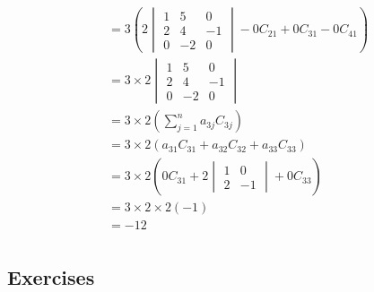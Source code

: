 \documentclass[12pt letter]{report}
\begin{document}
{{\begin{align*}
             & = 3 \left( 2 \begin{vmatrix} 1 & 5 & 0 \\ 2 & 4 & -1 \\ 0 & -2 & 0 \end{vmatrix} - 0 C_{21} + 0 C_{31} - 0
      C_{41}\right)                                                                                                       \\
             & = 3 \times 2 \begin{vmatrix} 1 & 5 & 0 \\ 2 & 4 & -1 \\ 0 & -2 & 0 \end{vmatrix}                           \\
             & = 3 \times 2 \left(
      \displaystyle\sum_{j=1}^{n} a_{3j} C_{3j}
      \right)                                                                                                             \\
             & = 3 \times 2 \left( a_{31} C_{31} + a_{32} C_{32} + a_{33} C_{33} \right)                                  \\
             & = 3 \times 2 \left( 0 C_{31} + 2 \begin{vmatrix} 1 & 0 \\ 2 & -1 \end{vmatrix} + 0 C_{33}  \right)         \\
             & = 3 \times 2 \times 2 \left( -1 \right)                                                                    \\
             & = -12                                                                                                      \\
    \end{align*}
  }
}


\subsection{Exercises}

\end{document}
